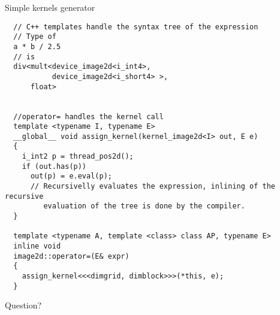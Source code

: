 \documentclass{beamer}
\begin{document}
\begin{frame}[containsverbatim]{Simple kernels generator}

    \begin{lstlisting}
  // C++ templates handle the syntax tree of the expression
  // Type of
  a * b / 2.5
  // is
  div<mult<device_image2d<i_int4>,
           device_image2d<i_short4> >,
      float>


  //operator= handles the kernel call
  template <typename I, typename E>
  __global__ void assign_kernel(kernel_image2d<I> out, E e)
  {
    i_int2 p = thread_pos2d();
    if (out.has(p))
      out(p) = e.eval(p);
      // Recursivelly evaluates the expression, inlining of the recursive
         evaluation of the tree is done by the compiler.
  }

  template <typename A, template <class> class AP, typename E>
  inline void
  image2d::operator=(E& expr)
  {
    assign_kernel<<<dimgrid, dimblock>>>(*this, e);
  }

    \end{lstlisting}

\end{frame}

\begin{frame}

 Question?

\end{frame}
\end{document}
